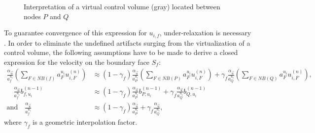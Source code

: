 \begin{figure}[h!]
  
  \centering{}
  \caption{Interpretation of a virtual control volume (gray) located between nodes $P$ and $Q$ }
  \label{fig:virt}
\end{figure}

To guarantee convergence of this expression for \(u_{i,f}\), under-relaxation is necessary \cite{majumdar88}. In order to eliminate the undefined artifacts surging from the virtualization of a control volume, the following assumptions have to be made to derive a closed expression for the velocity on the boundary face \(S_f\):
\begin{subequations}
\label{eq:approxpwim}
\begin{align}
  \frac{\alpha_{\vec{u}}}{a_f^{u_i}} \left(\sum_{F \in NB(f)} a_F^{u_i} u_{i,F}^{(n)} \right)
  &\approx
  \left(1-\gamma_f\right) \frac{\alpha_{\vec{u}}}{a_P^{u_i}} \left(\sum_{F \in NB(P)} a_F^{u_i} u_{i,F}^{(n)} \right)
  +
  \gamma_f \frac{\alpha_{\vec{u}}}{a_Q^{u_i}} \left(\sum_{F \in NB(Q)} a_F^{u_i} u_{i,F}^{(n)} \right), \\[1em]
  \quad
  \frac{\alpha_{\vec{u}}}{a_f^{u_i}}b_{f,u_i}^{(n-1)} 
  &\approx
  \left(1-\gamma_f\right) \frac{\alpha_{\vec{u}}}{a_P^{u_i}} b_{P,u_i}^{(n-1)} 
  +
  \gamma_f \frac{\alpha_{\vec{u}}}{a_Q^{u_i}} b_{Q,u_i}^{(n-1)} \\[1em]
  \text{and}
  \quad
  \frac{\alpha_{\vec{u}}}{a_f^{u_i}} 
  &\approx
  \left(1-\gamma_f\right) \frac{\alpha_{\vec{u}}}{a_P^{u_i}} 
  +
  \gamma_f \frac{\alpha_{\vec{u}}}{a_Q^{u_i}},
\end{align}
\end{subequations}
where \(\gamma_f\) is a geometric interpolation factor. 

